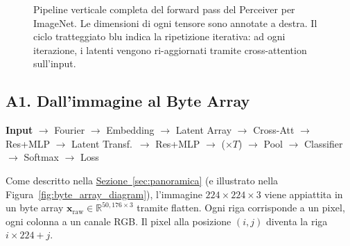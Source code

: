 \documentclass[12pt,a4paper]{article}
\begin{document}
\begin{figure}[H]
\caption{Pipeline verticale completa del forward pass del Perceiver per ImageNet. Le dimensioni di ogni tensore sono annotate a destra. Il ciclo tratteggiato blu indica la ripetizione iterativa: ad ogni iterazione, i latenti vengono ri-aggiornati tramite cross-attention sull'input.}
\label{fig:forward_pipeline_vertical}
\end{figure}


\subsection{A1. Dall'immagine al Byte Array} \label{sec:byte_array}

\begin{pipelinebox}
\textbf{Input} $\to$ Fourier $\to$ Embedding $\to$ Latent Array $\to$ Cross-Att $\to$ Res+MLP $\to$ Latent Transf.\ $\to$ Res+MLP $\to$ ($\times T$) $\to$ Pool $\to$ Classifier $\to$ Softmax $\to$ Loss
\end{pipelinebox}

Come descritto nella \hyperref[sec:panoramica]{Sezione~\ref*{sec:panoramica}} (e illustrato nella Figura~\ref{fig:byte_array_diagram}), l'immagine $224 \times 224 \times 3$ viene appiattita in un byte array $\mathbf{x}_{\text{raw}} \in \mathbb{R}^{50{,}176 \times 3}$ tramite flatten. Ogni riga corrisponde a un pixel, ogni colonna a un canale RGB. Il pixel alla posizione $(i, j)$ diventa la riga $i \times 224 + j$.

\end{document}
